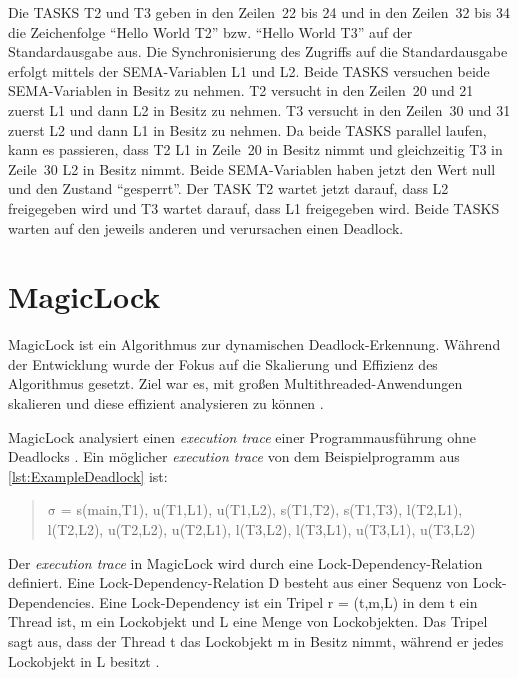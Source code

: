 Die \textrm{TASKS} \textrm{T2} und \textrm{T3} geben in den Zeilen~22 bis 24 und
in den Zeilen~32 bis 34 die Zeichenfolge "`Hello World T2"' bzw. "`Hello World
T3"' auf der Standardausgabe aus. Die Synchronisierung des Zugriffs auf die
Standardausgabe erfolgt mittels der \textrm{SEMA}-Variablen \textrm{L1} und
\textrm{L2}. Beide \textrm{TASKS} versuchen beide \textrm{SEMA}-Variablen in
Besitz zu nehmen. \textrm{T2} versucht in den Zeilen~20 und 21 zuerst
\textrm{L1} und dann \textrm{L2} in Besitz zu nehmen. \textrm{T3} versucht in
den Zeilen~30 und 31 zuerst \textrm{L2} und dann \textrm{L1} in Besitz zu
nehmen. Da beide \textrm{TASKS} parallel laufen, kann es passieren, dass
\textrm{T2} \textrm{L1} in Zeile~20 in Besitz nimmt und gleichzeitig \textrm{T3}
in Zeile~30 \textrm{L2} in Besitz nimmt. Beide \textrm{SEMA}-Variablen haben
jetzt den Wert null und den Zustand "`gesperrt"'. Der \textrm{TASK} \textrm{T2}
wartet jetzt darauf, dass \textrm{L2} freigegeben wird und
\textrm{T3} wartet darauf, dass \textrm{L1} freigegeben wird. Beide \textrm{TASKS}
warten auf den jeweils anderen und verursachen einen Deadlock.

\section{MagicLock}
\label{section:MagicLock}
MagicLock ist ein Algorithmus zur dynamischen Deadlock-Erkennung. Während der
Entwicklung wurde der Fokus auf die Skalierung und Effizienz des Algorithmus
gesetzt. Ziel war es, mit großen Multithreaded-Anwendungen skalieren und diese
effizient analysieren zu können \autocite[vgl.][1]{MagicLock}.

MagicLock analysiert einen \emph{execution trace} einer Programmausführung ohne
Deadlocks \autocite[vgl.][4]{MagicLock}. Ein möglicher \emph{execution trace}
von dem Beispielprogramm aus \cref{lst:ExampleDeadlock} ist:
\begin{quote}
  $\mathrm{\sigma}$ = \textrm{s(main,T1), u(T1,L1), u(T1,L2), s(T1,T2),
  s(T1,T3), l(T2,L1), l(T2,L2), u(T2,L2), u(T2,L1), l(T3,L2), l(T3,L1),
  u(T3,L1), u(T3,L2)}
\end{quote}
Der \emph{execution trace} in MagicLock wird durch eine Lock-Dependency-Relation
definiert. Eine Lock-Dependency-Relation \textrm{D} besteht aus einer Sequenz
von Lock-Dependencies. Eine Lock-Dependency ist ein Tripel \textrm{r = (t,m,L)}
in dem \textrm{t} ein Thread ist, \textrm{m} ein Lockobjekt und \textrm{L} eine
Menge von Lockobjekten. Das Tripel sagt aus, dass der Thread \textrm{t} das
Lockobjekt \textrm{m} in Besitz nimmt, während er jedes Lockobjekt in \textrm{L}
besitzt \autocite[vgl.][3]{MagicLock}.


